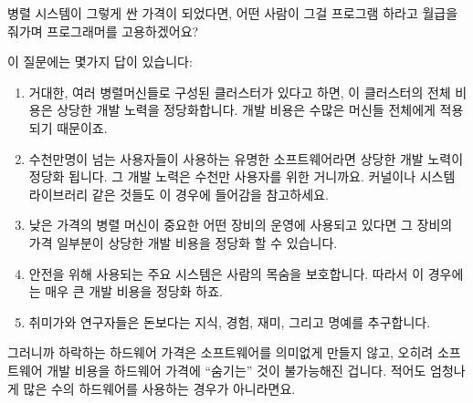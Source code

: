 \QuickQ{}
	병렬 시스템이 그렇게 싼 가격이 되었다면, 어떤 사람이 그걸 프로그램
	하라고 월급을 줘가며 프로그래머를 고용하겠어요?

\QuickA{}
	이 질문에는 몇가지 답이 있습니다:
	\begin{enumerate}
	\item	거대한, 여러 병렬머신들로 구성된 클러스터가 있다고 하면, 이 클러스터의 전체 비용은 상당한 개발 노력을 정당화합니다. 개발 비용은 수많은 머신들 전체에게 적용되기 때문이죠.
	\item	수천만명이 넘는 사용자들이 사용하는 유명한 소프트웨어라면 상당한 개발 노력이 정당화 됩니다. 그 개발 노력은 수천만 사용자를 위한 거니까요.
		커널이나 시스템 라이브러리 같은 것들도 이 경우에 들어감을 참고하세요.
	\item	낮은 가격의 병렬 머신이 중요한 어떤 장비의 운영에 사용되고 있다면 그 장비의 가격 일부분이 상당한 개발 비용을 정당화 할 수 있습니다.
	\item	안전을 위해 사용되는 주요 시스템은 사람의 목숨을 보호합니다. 따라서 이 경우에는 매우 큰 개발 비용을 정당화 하죠.
	\item	취미가와 연구자들은 돈보다는 지식, 경험, 재미, 그리고 명예를 추구합니다.
	\end{enumerate}
	그러니까 하락하는 하드웨어 가격은 소프트웨어를 의미없게 만들지 않고,
	오히려 소프트웨어 개발 비용을 하드웨어 가격에 ``숨기는'' 것이
	불가능해진 겁니다. 적어도 엄청나게 많은 수의 하드웨어를 사용하는 경우가
	아니라면요.

